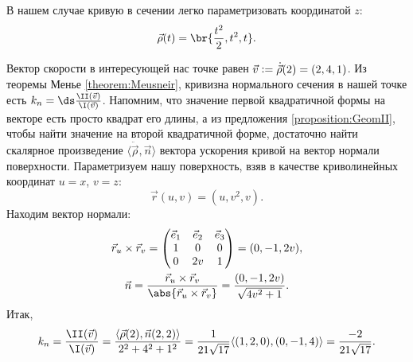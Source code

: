 \begin{solution}
	В нашем случае кривую в сечении легко параметризовать координатой $z$:
	\[
		\vec{\rho}(t) = \br{\frac{t^2}{2}, t^2, t}.
	\]

	Вектор скорости в интересующей нас точке равен $\vec{v} \vcentcolon = \dot{\vec{\rho}}(2) = (2, 4, 1)$. Из теоремы Менье \ref{theorem:Meusneir}, кривизна нормального сечения в нашей точке есть $k_n = \ds\frac{\II(\vec{v})}{\I(\vec{v})}$. Напомним, что значение первой квадратичной формы на векторе есть просто квадрат его длины, а из предложения \ref{proposition:GeomII}, чтобы найти значение на второй квадратичной форме, достаточно найти скалярное произведение $\langle\ddot{\vec{\rho}}, \vec{n}\rangle$ вектора ускорения кривой на вектор нормали поверхности. Параметризуем нашу поверхность, взяв в качестве криволинейных координат $u = x$, $v = z$:
	\[
		\vec{r}(u, v) = (u, v^2, v).
	\]
	Находим вектор нормали:
	\begin{gather*}
		\vec{r}_u \times \vec{r}_v =
		\begin{pmatrix}
			\vec{e}_1 & \vec{e}_2 & \vec{e}_3\\
			1 & 0 & 0\\
			0 & 2v & 1
		\end{pmatrix} = (0, -1, 2v),\\
		\vec{n} = \frac{\vec{r}_u \times \vec{r}_v}{\abs{\vec{r}_u \times \vec{r}_v}} = \frac{(0, -1, 2v)}{\sqrt{4v^2 + 1}}.
	\end{gather*}
	Итак,
	\[
		k_n = \frac{\II(\vec{v})}{\I(\vec{v})} = \frac{\langle\vec{\rho}(2), \vec{n}(2, 2)\rangle}{2^2 + 4^2 + 1^2} = \frac{1}{21\sqrt{17}}\langle(1, 2, 0), (0, -1, 4)\rangle = \frac{-2}{21\sqrt{17}}.
	\]
\end{solution}

